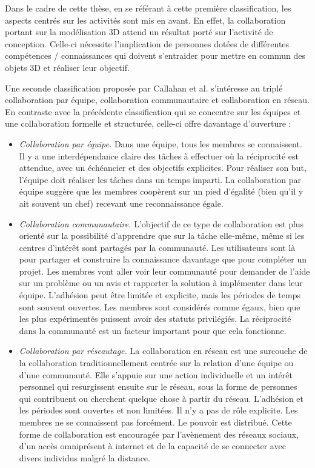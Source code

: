 Dans le cadre de cette thèse, en se référant à cette première classification, les 
aspects centrés sur les activités sont mis en avant. En effet, la collaboration 
portant sur la modélisation \gls{3D} attend un résultat porté sur l'activité de 
conception. 
Celle-ci nécessite l'implication de personnes dotées de différentes compétences / 
connaissances qui doivent s'entraider pour mettre en commun des 
objets \gls{3D} et réaliser leur objectif. 

Une seconde classification proposée par Callahan et al. 
\cite{Callahan2008} s'intéresse au triplé \og{} collaboration par équipe\fg{}, \og{} 
collaboration 
communautaire\fg{} et \og{} collaboration en réseau\fg{}. En contraste avec la 
précédente 
classification qui se concentre sur les équipes et une collaboration formelle et 
structurée, celle-ci offre davantage d'ouverture :
\begin{itemize}
	\item \textit{Collaboration par équipe.}
	Dans une équipe, tous les membres se connaissent. Il y a une interdépendance 
	claire des tâches à effectuer où la réciprocité est attendue, avec un échéancier 
	et des objectifs explicites. Pour réaliser son but, l'équipe doit réaliser les tâches 
	dans un temps imparti. La collaboration par équipe suggère que les membres 
	coopèrent sur un pied d'égalité (bien qu'il y ait souvent un chef) recevant une 
	reconnaissance égale.
	
	\item \textit{Collaboration communautaire.}
	L'objectif de ce type de collaboration est plus orienté sur la possibilité 
	d'apprendre que sur la tâche elle-même, même si les centres d'intérêt sont 
	partagés par la communauté. Les utilisateurs sont là pour partager et construire 
	la connaissance davantage que pour compléter un projet. Les membres vont aller voir leur 
	communauté pour demander de l'aide sur un problème ou un avis et rapporter la 
	solution à implémenter dans leur équipe. L'adhésion peut être limitée et 
	explicite, mais les périodes de temps sont souvent ouvertes. Les membres 
	sont considérés comme égaux, bien que les plus expérimentés puissent avoir 
	des statuts privilégiés. La réciprocité dans la 
	communauté est un facteur important pour que cela fonctionne.
	
	\item \textit{Collaboration par réseautage.}
	La collaboration en réseau est une surcouche de la collaboration 
	traditionnellement centrée sur la relation d'une équipe ou d'une communauté. 
	Elle s'appuie sur une action individuelle et un intérêt personnel qui resurgissent 
	ensuite sur le réseau, sous la forme de personnes qui contribuent ou cherchent 
	quelque chose à partir du réseau. L'adhésion et les périodes sont ouvertes et 
	non limitées. Il n'y a pas de rôle explicite. Les membres ne se connaissent pas 
	forcément. Le pouvoir est distribué. Cette forme de collaboration est encouragée par 
	l'avènement des réseaux sociaux, d'un accès omniprésent à internet et de la 
	capacité de se connecter avec divers individus malgré la distance.
\end{itemize}
